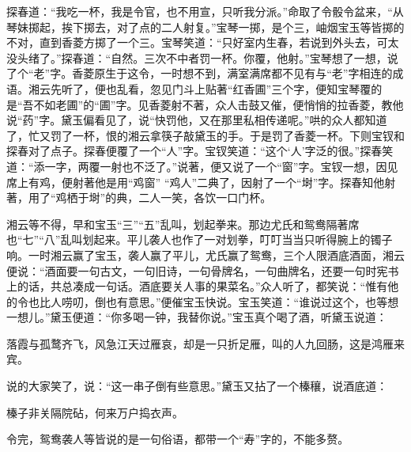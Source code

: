 \begin{parag}
    探春道：“我吃一杯，我是令官，也不用宣，只听我分派。”命取了令骰令盆来，“从琴妹掷起，挨下掷去，对了点的二人射复。”宝琴一掷，是个三，岫烟宝玉等皆掷的不对，直到香菱方掷了一个三。宝琴笑道：“只好室内生春，若说到外头去，可太没头绪了。”探春道：“自然。三次不中者罚一杯。你覆，他射。”宝琴想了一想，说了个“老”字。香菱原生于这令，一时想不到，满室满席都不见有与“老”字相连的成语。湘云先听了，便也乱看，忽见门斗上贴著“红香圃”三个字，便知宝琴覆的是“吾不如老圃”的“圃”字。见香菱射不著，众人击鼓又催，便悄悄的拉香菱，教他说“药”字。黛玉偏看见了，说“快罚他，又在那里私相传递呢。”哄的众人都知道了，忙又罚了一杯，恨的湘云拿筷子敲黛玉的手。于是罚了香菱一杯。下则宝钗和探春对了点子。探春便覆了一个“人”字。宝钗笑道：“这个‘人’字泛的很。”探春笑道：“添一字，两覆一射也不泛了。”说著，便又说了一个“窗”字。宝钗一想，因见席上有鸡，便射著他是用“鸡窗” “鸡人”二典了，因射了一个“埘”字。探春知他射著，用了“鸡栖于埘”的典，二人一笑，各饮一口门杯。
\end{parag}


\begin{parag}
    湘云等不得，早和宝玉“三”“五”乱叫，划起拳来。那边尤氏和鸳鸯隔著席也“七”“八”乱叫划起来。平儿袭人也作了一对划拳，叮叮当当只听得腕上的镯子响。一时湘云赢了宝玉，袭人赢了平儿，尤氏赢了鸳鸯，三个人限酒底酒面，湘云便说：“酒面要一句古文，一句旧诗，一句骨牌名，一句曲牌名，还要一句时宪书上的话，共总凑成一句话。酒底要关人事的果菜名。”众人听了，都笑说：“惟有他的令也比人唠叨，倒也有意思。”便催宝玉快说。宝玉笑道：“谁说过这个，也等想一想儿。”黛玉便道：“你多喝一钟，我替你说。”宝玉真个喝了酒，听黛玉说道：
\end{parag}


\begin{poem}
    \begin{pl}落霞与孤鹜齐飞，风急江天过雁哀，却是一只折足雁，叫的人九回肠，这是鸿雁来宾。\end{pl}
\end{poem}


\begin{parag}
    说的大家笑了，说：“这一串子倒有些意思。”黛玉又拈了一个榛穰，说酒底道：
\end{parag}


\begin{poem}
    \begin{pl}榛子非关隔院砧，何来万户捣衣声。\end{pl}
\end{poem}


\begin{parag}
    令完，鸳鸯袭人等皆说的是一句俗语，都带一个“寿”字的，不能多赘。
\end{parag}


